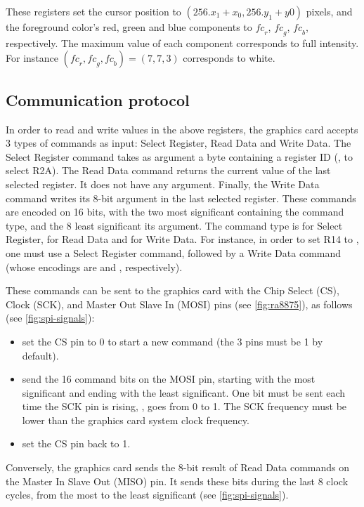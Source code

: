 These registers set the cursor position to $(256.x_1+x_0, 256.y_1+y0)$ pixels,
and the foreground color's red, green and blue components to $\mathit{fc}_r$,
$\mathit{fc}_g$, $\mathit{fc}_b$, respectively. The maximum value of each
component corresponds to full intensity. For instance
$(\mathit{fc}_r,\mathit{fc}_g,\mathit{fc}_b)=(7,7,3)$ corresponds to white.

\subsection{Communication protocol}\label{subsection:gpu-protocol}

In order to read and write values in the above registers, the graphics card
accepts 3 types of commands as input: Select Register, Read Data and Write
Data. The Select Register command takes as argument a byte containing a
register ID (\eg,  to select R2A). The Read Data command returns the
current value of the last selected register. It does not have any argument.
Finally, the Write Data command writes its 8-bit argument in the last selected
register. These commands are encoded on 16 bits, with the two most significant
containing the command type, and the 8 least significant its argument. The
command type is  for Select Register,  for Read Data and
 for Write Data. For instance, in order to set R14 to , one
must use a Select Register  command, followed by a Write Data
 command (whose encodings are  and ,
respectively).

These commands can be sent to the graphics card with the Chip Select
(CS), Clock (SCK), and Master Out Slave In (MOSI) pins (see \cref{fig:ra8875}),
as follows (see \cref{fig:spi-signals}):
\begin{itemize}
  \item set the CS pin to 0 to start a new command (the 3 pins must be
  1 by default).

  \item send the 16 command bits on the MOSI pin, starting with the most
  significant and ending with the least significant. One bit must be sent each
  time the SCK pin is rising, \ie, goes from 0 to 1. The SCK frequency must be
  lower than the graphics card system clock frequency.

  \item set the CS pin back to 1.
\end{itemize}
Conversely, the graphics card sends the 8-bit result of Read Data commands on
the Master In Slave Out (MISO) pin. It sends these bits during the last 8 clock
cycles, from the most to the least significant (see \cref{fig:spi-signals}).


